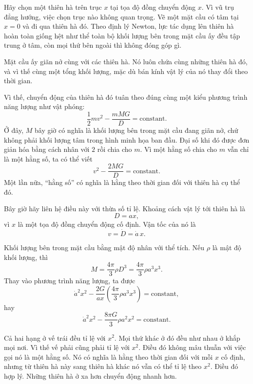 Hãy chọn một thiên hà trên trục \(x\) tại tọa độ đồng chuyển động \(x\). Vì vũ trụ đẳng hướng, việc chọn trục nào không quan trọng. Vẽ một mặt cầu có tâm tại \(x=0\) và đi qua thiên hà đó. Theo định lý Newton, lực tác dụng lên thiên hà hoàn toàn giống hệt như thể toàn bộ khối lượng bên trong mặt cầu ấy đều tập trung ở tâm, còn mọi thứ bên ngoài thì không đóng góp gì.

Mặt cầu ấy giãn nở cùng với các thiên hà. Nó luôn chứa cùng những thiên hà đó, và vì thế cùng một tổng khối lượng, mặc dù bán kính vật lý của nó thay đổi theo thời gian.

Vì thế, chuyển động của thiên hà đó tuân theo đúng cùng một kiểu phương trình năng lượng như vật phóng:
\begin{equation}
\frac{1}{2}mv^2-\frac{mMG}{D}=\text{constant}.
\end{equation}
Ở đây, \(M\) bây giờ có nghĩa là khối lượng bên trong mặt cầu đang giãn nở, chứ không phải khối lượng tâm trong hình minh họa ban đầu. Đại số khi đó được đơn giản hóa bằng cách nhân với \(2\) rồi chia cho \(m\). Vì một hằng số chia cho \(m\) vẫn chỉ là một hằng số, ta có thể viết
\begin{equation}
v^2-\frac{2MG}{D}=\text{constant}.
\end{equation}
Một lần nữa, ``hằng số'' có nghĩa là hằng theo thời gian đối với thiên hà cụ thể đó.

Bây giờ hãy liên hệ điều này với thừa số tỉ lệ. Khoảng cách vật lý tới thiên hà là
\begin{equation}
D=ax,
\end{equation}
vì \(x\) là một tọa độ đồng chuyển động cố định. Vận tốc của nó là
\begin{equation}
v=\dot D=\dot a\,x.
\end{equation}

Khối lượng bên trong mặt cầu bằng mật độ nhân với thể tích. Nếu \(\rho\) là mật độ khối lượng, thì
\begin{equation}
M=\frac{4\pi}{3}\rho D^3=\frac{4\pi}{3}\rho a^3x^3.
\end{equation}
Thay vào phương trình năng lượng, ta được
\begin{equation}
\dot a^2x^2-\frac{2G}{ax}\left(\frac{4\pi}{3}\rho a^3x^3\right)=\text{constant},
\end{equation}
hay
\begin{equation}
\dot a^2x^2-\frac{8\pi G}{3}\rho a^2x^2=\text{constant}.
\end{equation}

Cả hai hạng ở vế trái đều tỉ lệ với \(x^2\). Mọi thứ khác ở đó đều như nhau ở khắp mọi nơi. Vì thế vế phải cũng phải tỉ lệ với \(x^2\). Điều đó không mâu thuẫn với việc gọi nó là một hằng số. Nó có nghĩa là hằng theo thời gian đối với mỗi \(x\) cố định, nhưng từ thiên hà này sang thiên hà khác nó vẫn có thể tỉ lệ theo \(x^2\). Điều đó hợp lý. Những thiên hà ở xa hơn chuyển động nhanh hơn.

